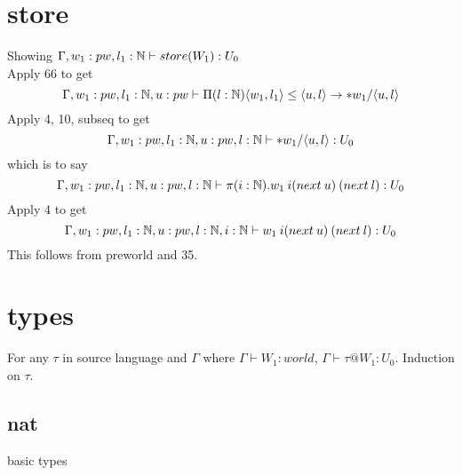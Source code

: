 \message{ !name(paper.tex)}\documentclass{article}
\begin{document}
     




\section*{store}
Showing $\Gamma, w_1: pw, l_1: \mathbb{N} \vdash store(W_1) : U_0$\\
Apply 66 to get
\[\Gamma, w_1: pw, l_1 : \mathbb{N}, u: pw \vdash
\Pi(l : \mathbb{N})\langle w_1, l_1 \rangle \leq \langle u, l \rangle \rightarrow *w_1/\langle u, l \rangle
\]
Apply 4, 10, subseq to get
\[\Gamma, w_1: pw, l_1 : \mathbb{N}, u: pw, l : \mathbb{N} \vdash
*w_1/\langle u, l \rangle : U_0
\]
which is to say 
\[\Gamma, w_1: pw, l_1 : \mathbb{N}, u: pw, l : \mathbb{N} \vdash
\pi(i: \mathbb{N}). w_1 \: i (next \: u) \: (next\: l) : U_0
\]
Apply 4 to get
\[\Gamma, w_1: pw, l_1 : \mathbb{N}, u: pw, l : \mathbb{N}, i: \mathbb{N} \vdash
 w_1 \: i (next \: u) \: (next\: l) : U_0
\]
This follows from preworld and 35.


\section*{types}
For any $\tau$ in source language and $\Gamma$ where $\Gamma \vdash W_1 : world$, $\Gamma \vdash \tau@W_1 : U_0$. Induction on $\tau$.
\subsection{nat}
basic types
\end{document}
